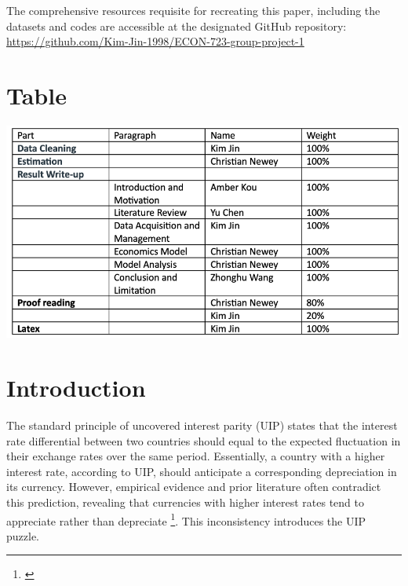 \documentclass[10pt]{article}
\begin{document}
The comprehensive resources requisite for recreating this paper, including the datasets and codes are accessible at the designated GitHub repository: \url{https://github.com/Kim-Jin-1998/ECON-723-group-project-1}

\newpage

\section*{Table}

\includegraphics[scale =1]{picture/table.png}


\newpage
\tableofcontents

\newpage
{}

\section{Introduction}
The standard principle of uncovered interest parity (UIP) states that the interest rate differential between two countries should equal to the expected fluctuation in their exchange rates over the same period. Essentially, a country with a higher interest rate, according to UIP, should anticipate a corresponding depreciation in its currency. However, empirical evidence and prior literature often contradict this prediction, revealing that currencies with higher interest rates tend to appreciate rather than depreciate \footnote{\cite{kalemli2021five}\label{kalemli2021five}}. This inconsistency introduces the UIP puzzle.
\end{document}
